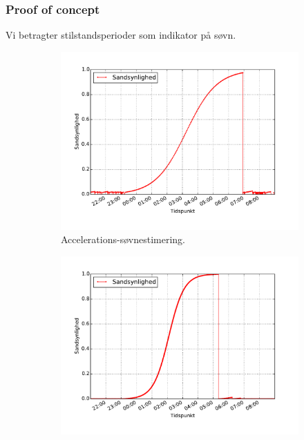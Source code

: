 \begin{frame}
\frametitle{Proof of concept}
Vi betragter stilstandsperioder som indikator på søvn.

\begin{figure}
	\begin{minipage}{\linewidth}
		\begin{subfigure}{0.32\linewidth}
			\centering
			\includegraphics[scale=0.2, trim = 1cm 1cm 1cm 1cm, clip]{../Report/grafik/kombi_figur/acceleration-sleep-estimate-plot}
			\caption{Accelerations-søvnestimering.}\label{fig:sleepcalcaccplot}
		\end{subfigure}
		\begin{subfigure}{0.32\linewidth}
			\centering
			\includegraphics[scale=0.2, trim = 0cm 1cm 1cm 1cm, clip]{../Report/grafik/kombi_figur/amplitude-sleep-estimate-plot}

\end{subfigure}
\end{minipage}
\end{figure}
\end{frame}
